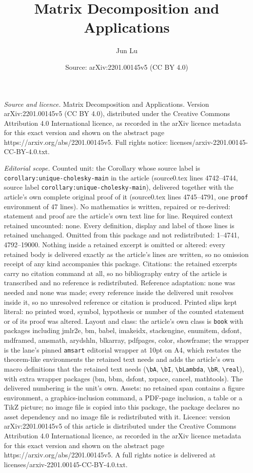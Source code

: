 \documentclass[10pt,a4paper]{amsart}
\title[Matrix Decomposition and Applications]{Matrix Decomposition and Applications}
\author{Jun Lu}
\date{Source: arXiv:2201.00145v5 (CC BY 4.0)}
\begin{document}
\maketitle

\noindent\emph{Source and licence.} Matrix Decomposition and Applications. Version arXiv:2201.00145v5 (CC BY 4.0), distributed under the Creative Commons Attribution 4.0 International licence, as recorded in the arXiv licence metadata for this exact version and shown on the abstract page https://arxiv.org/abs/2201.00145v5. Full rights notice: licenses/arxiv-2201.00145-CC-BY-4.0.txt.\par\smallskip

\noindent\textit{Editorial scope.} Counted unit: the Corollary whose source label is \texttt{corollary:unique-cholesky-main} in the article (source0.tex lines 4742--4744, source label \texttt{corollary:unique-cholesky-main}), delivered together with the article's own complete original proof of it (source0.tex lines 4745--4791, one \texttt{proof} environment of 47 lines). No mathematics is written, repaired or re-derived: statement and proof are the article's own text line for line. Required context retained uncounted: none. Every definition, display and label of those lines is retained unchanged. Omitted from this package and not redistributed: 1--4741, 4792--19000. Nothing inside a retained excerpt is omitted or altered: every retained body is delivered exactly as the article's lines are written, so no omission receipt of any kind accompanies this package. Citations: the retained excerpts carry no citation command at all, so no bibliography entry of the article is transcribed and no reference is redistributed. Reference adaptation: none was needed and none was made; every reference inside the delivered unit resolves inside it, so no unresolved reference or citation is produced. Printed slips kept literal: no printed word, symbol, hypothesis or number of the counted statement or of its proof was altered. Layout and class: the article's own class is \texttt{book} with packages including jmlr2e, bm, babel, imakeidx, stackengine, enumitem, dsfont, mdframed, amsmath, arydshln, blkarray, pdfpages, color, showframe; the wrapper is the lane's pinned \texttt{amsart} editorial wrapper at 10pt on A4, which restates the theorem-like environments the retained text needs and adds the article's own macro definitions that the retained text needs (\texttt{\textbackslash bA}, \texttt{\textbackslash bI}, \texttt{\textbackslash bLambda}, \texttt{\textbackslash bR}, \texttt{\textbackslash real}), with extra wrapper packages (bm, bbm, dsfont, xspace, cancel, mathtools). The delivered numbering is the unit's own. Assets: no retained span contains a figure environment, a graphics-inclusion command, a PDF-page inclusion, a table or a TikZ picture; no image file is copied into this package, the package declares no asset dependency and no image file is redistributed with it. Licence: version arXiv:2201.00145v5 of this article is distributed under the Creative Commons Attribution 4.0 International licence, as recorded in the arXiv licence metadata for this exact version and shown on the abstract page https://arxiv.org/abs/2201.00145v5. A full rights notice is delivered at licenses/arxiv-2201.00145-CC-BY-4.0.txt. 
\end{document}
